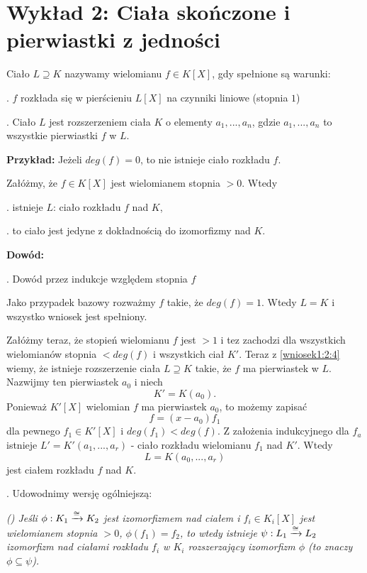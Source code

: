 \section{Wykład 2: Ciała skończone i pierwiastki z jedności}

\begin{important}
Ciało $L\supseteq K$ nazywamy  wielomianu $f\in K[X]$, gdy spełnione są warunki:

. $f$ rozkłada się w pierścieniu $L[X]$ na czynniki liniowe (stopnia $1$)

. Ciało $L$ jest rozszerzeniem ciała $K$ o elementy $a_1,...,a_n$, gdzie $a_1,...,a_n$ to wszystkie pierwiastki $f$ w $L$.
\end{important}

\textbf{Przykład:} Jeżeli $deg(f)=0$, to nie istnieje ciało rozkładu $f$.

\begin{wniosek}
    Załóżmy, że $f\in K[X]$ jest wielomianem stopnia $>0$. Wtedy

. istnieje $L$: ciało rozkładu $f$ nad $K$,

. to ciało jest jedyne z dokładnością do izomorfizmy nad $K$.
\end{wniosek}

\textbf{Dowód:}

. Dowód przez indukcje względem stopnia $f$

Jako przypadek bazowy rozważmy $f$ takie, że $deg(f)=1$. Wtedy $L=K$ i wszystko wniosek jest spełniony.

Załóżmy teraz, że stopień wielomianu $f$ jest $>1$ i tez zachodzi dla wszystkich wielomianów stopnia $<deg(f)$ i wszystkich ciał $K'$. Teraz z \ref{wniosek1:2:4} wiemy, że istnieje rozszerzenie ciała $L\supseteq K$ takie, że $f$ ma pierwiastek w $L$. Nazwijmy ten pierwiastek $a_0$ i niech
$$K'=K(a_0).$$
Ponieważ $K'[X]$ wielomian $f$ ma pierwiastek $a_0$, to możemy zapisać
$$f=(x-a_0)f_1$$
dla pewnego $f_1\in K'[X]$ i $deg(f_1)<deg(f)$. Z założenia indukcyjnego dla $f_a$ istnieje $L'=K'(a_1,...,a_r)$ - ciało rozkładu wielomianu $f_1$ nad $K'$. Wtedy 
$$L=K(a_0,...,a_r)$$
jest ciałem rozkładu $f$ nad $K$.

. Udowodnimy wersję ogólniejszą: 
\label{stwierdzenie:wniosek}

\emph{(\bat) Jeśli $\phi:K_1\xrightarrow[]{\cong} K_2$ jest izomorfizmem nad ciałem i $f_i\in K_i[X]$ jest wielomianem stopnia $>0$, $\phi(f_1)=f_2$, to wtedy istnieje $ \psi:L_1\xrightarrow[]{\cong} L_2$ izomorfizm nad ciałami rozkładu $f_i$ w $K_i$ rozszerzający izomorfizm $\phi$ (to znaczy $\phi\subseteq \psi$).}

